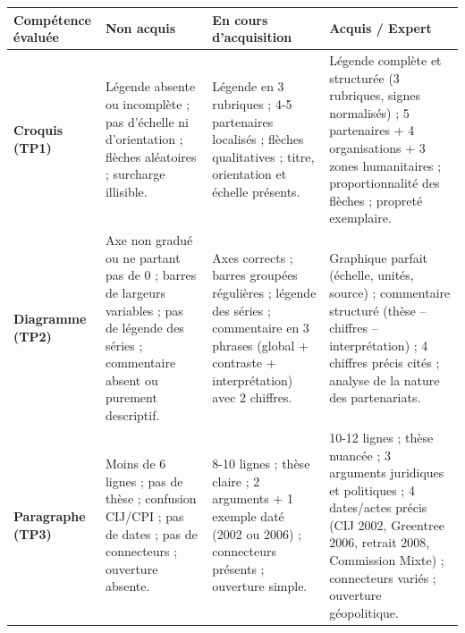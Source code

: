 \documentclass[11pt]{article}
\begin{document}
\begin{aretenir}
\begin{center}
\begin{tabularx}{\linewidth}{|l|X|X|X|}\hline
\rowcolor{popblueL}
\textbf{Compétence évaluée} & \textbf{Non acquis} & \textbf{En cours d'acquisition} & \textbf{Acquis / Expert} \\ \hline
\textbf{Croquis (TP1)} & Légende absente ou incomplète ; pas d'échelle ni d'orientation ; flèches aléatoires ; surcharge illisible. & Légende en 3 rubriques ; 4-5 partenaires localisés ; flèches qualitatives ; titre, orientation et échelle présents. & Légende complète et structurée (3 rubriques, signes normalisés) ; 5 partenaires + 4 organisations + 3 zones humanitaires ; proportionnalité des flèches ; propreté exemplaire. \\ \hline
\textbf{Diagramme (TP2)} & Axe non gradué ou ne partant pas de 0 ; barres de largeurs variables ; pas de légende des séries ; commentaire absent ou purement descriptif. & Axes corrects ; barres groupées régulières ; légende des séries ; commentaire en 3 phrases (global + contraste + interprétation) avec 2 chiffres. & Graphique parfait (échelle, unités, source) ; commentaire structuré (thèse -- chiffres -- interprétation) ; 4 chiffres précis cités ; analyse de la nature des partenariats. \\ \hline
\textbf{Paragraphe (TP3)} & Moins de 6 lignes ; pas de thèse ; confusion CIJ/CPI ; pas de dates ; pas de connecteurs ; ouverture absente. & 8-10 lignes ; thèse claire ; 2 arguments + 1 exemple daté (2002 ou 2006) ; connecteurs présents ; ouverture simple. & 10-12 lignes ; thèse nuancée ; 3 arguments juridiques et politiques ; 4 dates/actes précis (CIJ 2002, Greentree 2006, retrait 2008, Commission Mixte) ; connecteurs variés ; ouverture géopolitique. \\ \hline
\end{tabularx}
\end{center}
\end{aretenir}
\end{document}
